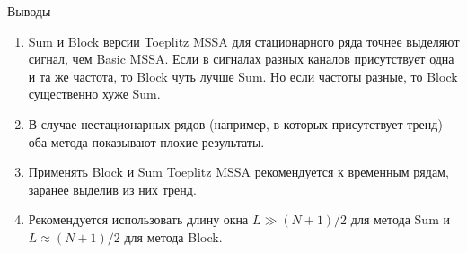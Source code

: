 \documentclass[ucs, notheorems, handout]{beamer}
\begin{document}
\begin{frame}{Выводы}
	\begin{enumerate}
		\item Sum и Block версии Toeplitz MSSA для стационарного ряда точнее выделяют сигнал, чем Basic MSSA. Если в сигналах разных каналов присутствует одна и та же частота, то Block чуть лучше Sum. Но если частоты разные, то Block существенно хуже Sum.\medskip
		\item В случае нестационарных рядов (например, в которых присутствует тренд) оба метода показывают плохие результаты.\medskip
		\item Применять Block и Sum Toeplitz MSSA рекомендуется к временным рядам, заранее выделив из них тренд.\medskip
		\item Рекомендуется использовать длину окна $L\gg(N+1)/2$ для метода Sum и $L\approx (N+1)/2$ для метода Block.
	\end{enumerate}
\end{frame}
\end{document}
